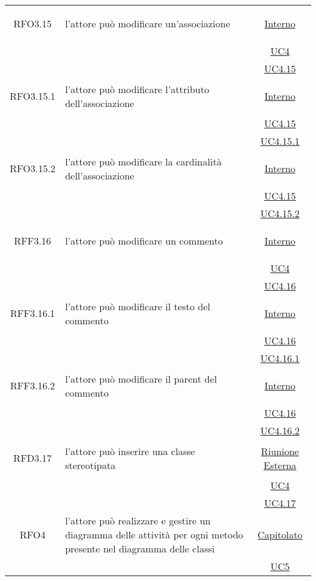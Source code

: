 \begin{longtable}{|c|>{\centering}m{7cm}|c|}
\hypertarget{RFO3.15}{RFO3.15} & l'attore può modificare un'associazione &  \hyperlink{Interno}{Interno}\\
& &\hyperref[UC4]{UC4}\\
& &\hyperref[UC4.15]{UC4.15}\\ \hline

\hypertarget{RFO3.15.1}{RFO3.15.1} & l'attore può modificare l'attributo dell'associazione &  \hyperlink{Interno}{Interno}\\
& &\hyperref[UC4.15]{UC4.15}\\
& &\hyperref[UC4.15.1]{UC4.15.1}\\ \hline

\hypertarget{RFO3.15.2}{RFO3.15.2} & l'attore può modificare la cardinalità dell'associazione &  \hyperlink{Interno}{Interno}\\
& &\hyperref[UC4.15]{UC4.15}\\
& &\hyperref[UC4.15.2]{UC4.15.2}\\ \hline

\hypertarget{RFF3.16}{RFF3.16} & l'attore può modificare un commento &  \hyperlink{Interno}{Interno}\\
& &\hyperref[UC4]{UC4}\\
& &\hyperref[UC4.16]{UC4.16}\\ \hline

\hypertarget{RFF3.16.1}{RFF3.16.1} & l'attore può modificare il testo del commento &  \hyperlink{Interno}{Interno}\\
& &\hyperref[UC4.16]{UC4.16}\\
& &\hyperref[UC4.16.1]{UC4.16.1}\\ \hline

\hypertarget{RFF3.16.2}{RFF3.16.2} & l'attore può modificare il parent del commento &  \hyperlink{Interno}{Interno}\\
& &\hyperref[UC4.16]{UC4.16}\\
& &\hyperref[UC4.16.2]{UC4.16.2}\\ \hline

\hypertarget{RFD3.17}{RFD3.17} & l'attore può inserire una classe stereotipata &  \hyperlink{Riunione Esterna}{Riunione Esterna}\\
& &\hyperref[UC4]{UC4}\\
& &\hyperref[UC4.17]{UC4.17}\\ \hline
\hypertarget{RFO4}{RFO4} & l'attore può realizzare e gestire un diagramma delle attività per ogni metodo presente nel diagramma delle classi & \hyperlink{Capitolato}{Capitolato}\\
& & \hyperref[UC5]{UC5}\\ \hline


\end{longtable}
